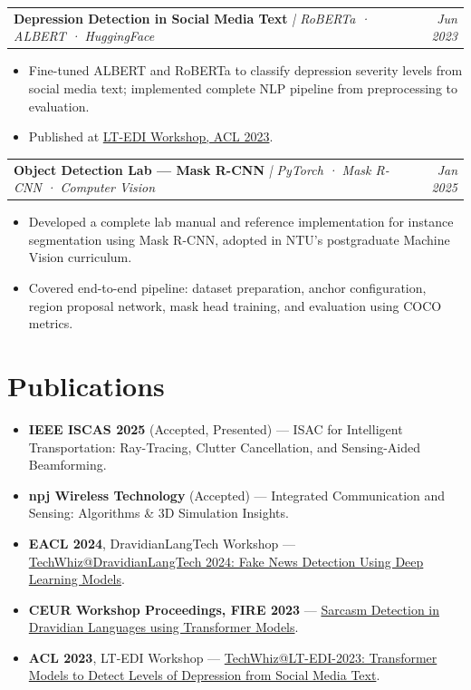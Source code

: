 \documentclass[10pt, a4paper]{article}
\makeatletter
\newcommand{\projentry}[3]{%
    \noindent
    \begin{tabularx}{\textwidth}{@{}X r@{}}
        \textbf{#1} \textit{\small | #2} & \textit{#3}
    \end{tabularx}%
    \vspace{1pt}%
}
\newcommand{\entryspace}{\vspace{6pt}}
\newcommand{\sectionspace}{\vspace{2pt}}
\makeatother
\begin{document}
\entryspace

\projentry{Depression Detection in Social Media Text}{RoBERTa · ALBERT · HuggingFace}{Jun 2023}
\begin{itemize}
    \item Fine-tuned ALBERT and RoBERTa to classify depression severity levels from social media text; implemented complete NLP pipeline from preprocessing to evaluation.
    \item Published at \href{https://aclanthology.org/2023.ltedi-1.0}{LT-EDI Workshop, ACL 2023}.
\end{itemize}

\entryspace

\projentry{Object Detection Lab --- Mask R-CNN}{PyTorch · Mask R-CNN · Computer Vision}{Jan 2025}
\begin{itemize}
    \item Developed a complete lab manual and reference implementation for instance segmentation using Mask R-CNN, adopted in NTU's postgraduate Machine Vision curriculum.
    \item Covered end-to-end pipeline: dataset preparation, anchor configuration, region proposal network, mask head training, and evaluation using COCO metrics.
\end{itemize}

\entryspace

\section{Publications}
\sectionspace

\begin{itemize}
    \item \textbf{IEEE ISCAS 2025} (Accepted, Presented) --- ISAC for Intelligent Transportation: Ray-Tracing, Clutter Cancellation, and Sensing-Aided Beamforming.
    \item \textbf{npj Wireless Technology} (Accepted) --- Integrated Communication and Sensing: Algorithms \& 3D Simulation Insights.
    \item \textbf{EACL 2024}, DravidianLangTech Workshop --- \href{https://aclanthology.org/2024.dravidianlangtech-1.0}{TechWhiz@DravidianLangTech 2024: Fake News Detection Using Deep Learning Models}.
    \item \textbf{CEUR Workshop Proceedings, FIRE 2023} --- \href{https://ceur-ws.org}{Sarcasm Detection in Dravidian Languages using Transformer Models}.
    \item \textbf{ACL 2023}, LT-EDI Workshop --- \href{https://aclanthology.org/2023.ltedi-1.0}{TechWhiz@LT-EDI-2023: Transformer Models to Detect Levels of Depression from Social Media Text}.
\end{itemize}
\end{document}
